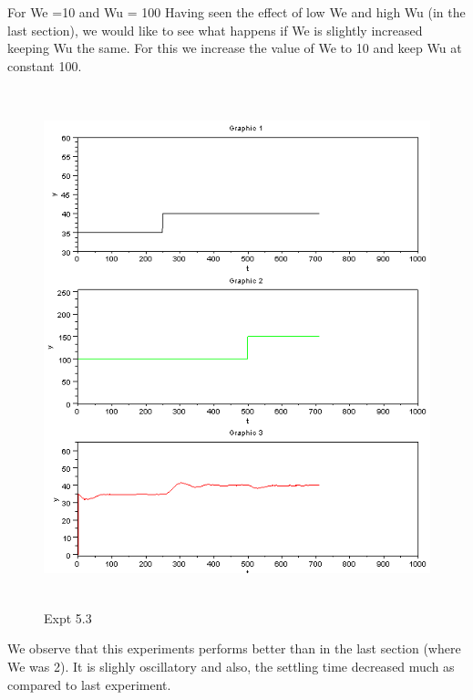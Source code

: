 For We =10 and Wu = 100
Having seen the effect of low We and high Wu (in the last section), we would like to see what happens if We is slightly increased keeping Wu the same. For this we increase the value of We to 10 and keep Wu at constant 100.
\begin{figure}[H]
  \includegraphics[width=12cm, height=15cm]{mpc/5_3.PNG}
  \caption{Expt 5.3}
\end{figure}
We observe that this experiments performs better than in the last section (where We was 2). It is slighly oscillatory and also, the settling time decreased much as compared to last experiment.
